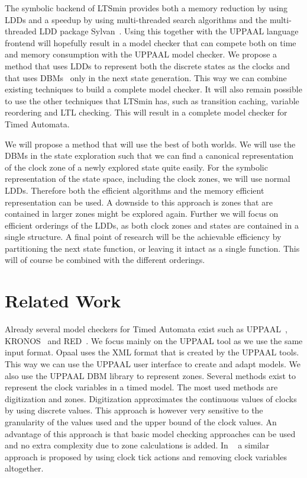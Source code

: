 \documentclass[11pt]{article}
\begin{document}
The symbolic backend of LTSmin provides both a memory reduction by using LDDs and a speedup by using multi-threaded search algorithms and the multi-threaded LDD package Sylvan~\cite{sylvan}. Using this together with the UPPAAL language frontend will hopefully result in a model checker that can compete both on time and memory consumption with the UPPAAL model checker. We propose a method that uses LDDs to represent both the discrete states as the clocks and that uses DBMs~\cite{dbmorig, bengtsson2002clocks} only in the next state generation. This way we can combine existing techniques to build a complete model checker. It will also remain possible to use the other techniques that LTSmin has, such as transition caching, variable reordering and LTL checking. This will result in a complete model checker for Timed Automata.

We will propose a method that will use the best of both worlds. We will use the DBMs in the state exploration such that we can find a canonical representation of the clock zone of a newly explored state quite easily. For the symbolic representation of the state space, including the clock zones, we will use normal LDDs. Therefore both the efficient algorithms and the memory efficient representation can be used. A downside to this approach is zones that are contained in larger zones might be explored again. Further we will focus on efficient orderings of the LDDs, as both clock zones and states are contained in a single structure. A final point of research will be the achievable efficiency by partitioning the next state function, or leaving it intact as a single function. This will of course be combined with the different orderings. 

\section{Related Work}
Already several model checkers for Timed Automata exist such as UPPAAL~\cite{UPPAAL}, KRONOS~\cite{kronos} and RED~\cite{crds}. We focus mainly on the UPPAAL tool as we use the same input format. Opaal uses the XML format that is created by the UPPAAL tools. This way we can use the UPPAAL user interface to create and adapt models. We also use the UPPAAL DBM library to represent zones.
Several methods exist to represent the clock variables in a timed model. The most used methods are digitization and zones. 
Digitization approximates the continuous values of clocks by using discrete values. This approach is however very sensitive to the granularity of the values used and the upper bound of the clock values. An advantage of this approach is that basic model checking approaches can be used and no extra complexity due to zone calculations is added. In ~\cite{nguyen2012discrete} a similar approach is proposed by using clock tick actions and removing clock variables altogether. 
\end{document}

